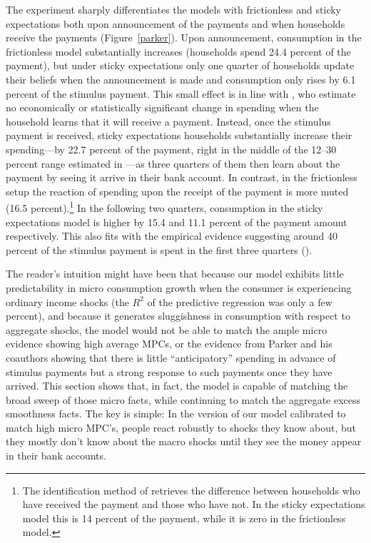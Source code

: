 \documentclass[titlepage]{./econtex}
\begin{document}
The experiment sharply differentiates the models with frictionless and sticky expectations both upon announcement of the payments and when households receive the payments (Figure~\ref{parker}). Upon announcement, consumption in the frictionless model substantially increases (households spend 24.4 percent of the payment), but under sticky expectations only one quarter of households update their beliefs when the announcement is made and consumption only rises by 6.1 percent of the stimulus payment.  This small effect is in line with \cite{brodaParker}, who estimate no economically or statistically significant change in spending when the household learns that it will receive a payment.  Instead, once the stimulus payment is received, sticky expectations households substantially increase their spending---by 22.7 percent of the payment, right in the middle of the 12--30 percent range estimated in \cite{psjmMPC2008}---as three quarters of them then learn about the payment by seeing it arrive in their bank account. In contrast, in the frictionless setup the reaction of spending upon the receipt of the payment is more muted (16.5 percent).\footnote{The identification method of \cite{psjmMPC2008} retrieves the difference between households who have received the payment and those who have not. In the sticky expectations model this is 14 percent of the payment, while it is zero in the frictionless model.} In the following two quarters, consumption in the sticky expectations model is higher by 15.4 and 11.1 percent of the payment amount respectively. This also fits with the empirical evidence suggesting around 40 percent of the stimulus payment is spent in the first three quarters (\cite{psjmMPC2008}).

The reader's intuition might have been that because our model exhibits little predictability in micro consumption growth when the consumer is experiencing ordinary income shocks (the $R^{2}$ of the predictive regression was only a few percent), and because it generates sluggishness in consumption with respect to aggregate shocks, the model would not be able to match the ample micro evidence showing high average MPCs, or the evidence from Parker and his coauthors showing that there is little ``anticipatory'' spending in advance of stimulus payments but a strong response to such payments once they have arrived.  This section shows that, in fact, the model is capable of matching the broad sweep of those micro facts, while continuing to match the aggregate excess smoothness facts.  The key is simple: In the version of our model calibrated to match high micro MPC's, people react robustly to shocks they know about, but they mostly don't know about the macro shocks until they see the money appear in their bank accounts.
\end{document}

